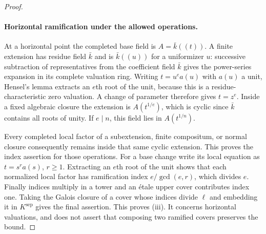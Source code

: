 \begin{proof}
\paragraph{Horizontal ramification under the allowed operations.}
\label{clm:D15-horizontal}
At a horizontal point the completed base field is
$A=\bar k((t))$. A finite extension has residue field $\bar k$
and is $\bar k((u))$ for a uniformizer $u$: successive subtraction
of representatives from the coefficient field $\bar k$ gives the
power-series expansion in its complete valuation ring.
Writing $t=u^e a(u)$ with $a(u)$ a unit, Hensel's lemma extracts
an $e$th root of the unit, because this is a residue-characteristic
zero valuation. A change of parameter therefore gives $t=z^e$.
Inside a fixed algebraic closure the extension is
$A(t^{1/e})$, which is cyclic since $\bar k$ contains all roots
of unity. If $e\mid n$, this field lies in $A(t^{1/n})$.

Every completed local factor of a subextension, finite compositum,
or normal closure consequently remains inside that same cyclic
extension. This proves the index assertion for those operations.
For a base change write its local equation as $t=s^r a(s)$,
$r\ge1$. Extracting an $e$th root of the unit shows that each
normalized local factor has ramification index
$e/\gcd(e,r)$, which divides $e$. Finally indices multiply in a
tower and an \'etale upper cover contributes index one. Taking
the Galois closure of a cover whose indices divide $\ell$ and
embedding it in $K^{\mathrm{sep}}$ gives the final assertion.
This proves (iii). It concerns horizontal valuations, and does not
assert that composing two ramified covers preserves the bound.
\end{proof}

